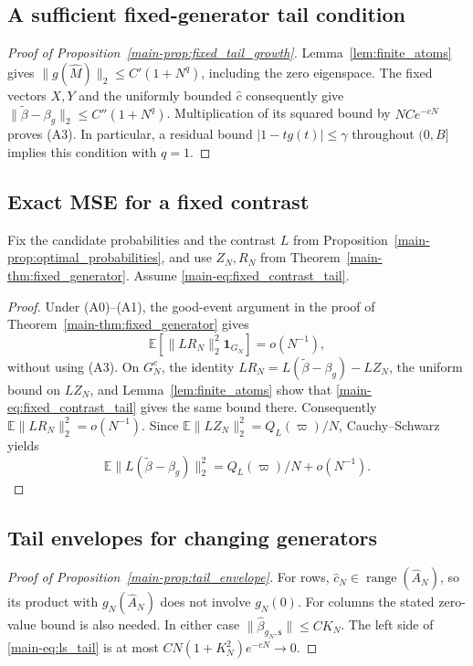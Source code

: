 \documentclass[11pt,a4paper,leqno]{article}
\numberwithin{equation}{section}
\numberwithin{figure}{section}
\numberwithin{table}{section}
\theoremstyle{plain}
\theoremstyle{definition}
\theoremstyle{remark}
\newcommand{\E}{\mathbb E}
\newcommand{\norm}[1]{\lVert#1\rVert}
\begin{document}
\subsection{A sufficient fixed-generator tail condition}
\label{supp:proof-fixed-tail}

\begin{proof}[Proof of Proposition~{\upshape\ref{main-prop:fixed_tail_growth}}]
Lemma~\ref{lem:finite_atoms} gives
$\|g(\widehat M)\|_2\le C'(1+N^q)$, including the zero eigenspace.
The fixed vectors $X,Y$ and the uniformly bounded $\widehat c$ consequently
give $\|\widetilde\beta-\beta_g\|_2\le C''(1+N^q)$.
Multiplication of its squared bound by $NCe^{-cN}$ proves (A3).
In particular, a residual bound $|1-tg(t)|\le\gamma$ throughout $(0,B]$
implies this condition with $q=1$.
\end{proof}

\subsection{Exact MSE for a fixed contrast}
\label{supp:proof-contrast-mse}
Fix the candidate probabilities and the contrast $L$ from
Proposition~\ref{main-prop:optimal_probabilities}, and use $Z_N,R_N$ from
Theorem~\ref{main-thm:fixed_generator}. Assume \eqref{main-eq:fixed_contrast_tail}.
\begin{proof}
Under (A0)--(A1), the good-event argument in the proof of
Theorem~\ref{main-thm:fixed_generator} gives
\[
 \E[\|LR_N\|_2^2 \mathbf{1}_{G_N}]=o(N^{-1}),
\]
without using (A3).
On $G_N^c$, the identity
$LR_N=L(\widetilde\beta-\beta_g)-LZ_N$, the uniform bound on $LZ_N$,
and Lemma~\ref{lem:finite_atoms} show that
\eqref{main-eq:fixed_contrast_tail} gives the same bound there.
Consequently $\E\|LR_N\|_2^2=o(N^{-1})$.
Since $\E\|LZ_N\|_2^2=Q_L(\varpi)/N$, Cauchy--Schwarz yields
\[
 \E\|L(\widetilde\beta-\beta_g)\|_2^2
       =Q_L(\varpi)/N+o(N^{-1}).
\]
\end{proof}


\subsection{Tail envelopes for changing generators}
\label{supp:proof-tail-envelope}

\begin{proof}[Proof of Proposition~{\upshape\ref{main-prop:tail_envelope}}]
For rows, $\widehat c_N\in\operatorname{range}(\widehat A_N)$, so its product
with $g_N(\widehat A_N)$ does not involve $g_N(0)$.
For columns the stated zero-value bound is also needed.
In either case $\norm{\widehat\beta_{g_N,\mathsf{s}}}\le CK_N$.
The left side of \eqref{main-eq:ls_tail} is at most
$CN(1+K_N^2)e^{-cN}\to0$.
\end{proof}
\end{document}
